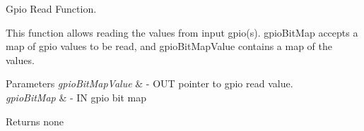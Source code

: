 Gpio Read Function. 

This function allows reading the values from input gpio(s). gpioBitMap accepts a map of gpio values to be read, and gpioBitMapValue contains a map of the values.


\begin{DoxyParams}{Parameters}
{\em gpioBitMapValue} & -\/ OUT pointer to gpio read value. \\
\hline
{\em gpioBitMap} & -\/ IN gpio bit map\\
\hline
\end{DoxyParams}
\begin{DoxyReturn}{Returns}
none 
\end{DoxyReturn}
